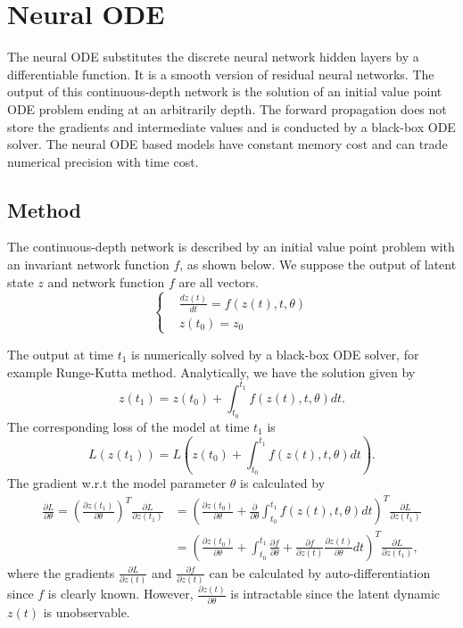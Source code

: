 \section{Neural ODE}

The neural ODE \cite{chen2019neuralordinarydifferentialequations} substitutes the discrete neural network hidden layers by a differentiable function. 
It is a smooth version of residual neural networks. 
The output of this continuous-depth network is the solution of an initial value point ODE problem ending at an arbitrarily depth. 
The forward propagation does not store the gradients and intermediate values and is conducted by a black-box ODE solver. 
The neural ODE based models have constant memory cost and can trade numerical precision with time cost. 

\subsection{Method}

The continuous-depth network is described by an initial value point problem with an invariant network function $f$, as shown below. 
We suppose the output of latent state $z$ and network function $f$ are all vectors. 
\begin{equation*}
    \left\{\begin{aligned}
        &\frac{dz(t)}{dt} = f(z(t),t,\theta) \\
        &z(t_0) = z_0
    \end{aligned}\right.
\end{equation*}

The output at time $t_1$ is numerically solved by a black-box ODE solver, for example Runge-Kutta method. 
Analytically, we have the solution given by 
\begin{equation*}
    z(t_1) = z(t_0) + \int_{t_0}^{t_1} f(z(t),t,\theta)dt. 
\end{equation*}
The corresponding loss of the model at time $t_1$ is 
\begin{equation*}
    L(z(t_1)) = L\left(z(t_0) + \int_{t_0}^{t_1} f(z(t),t,\theta)dt\right). 
\end{equation*}
The gradient w.r.t the model parameter $\theta$ is calculated by 
\begin{align*}
    \frac{\partial L}{\partial \theta} = \left(\frac{\partial z(t_1)}{\partial \theta}\right)^T\frac{\partial L}{\partial z(t_1)} &= \left(\frac{\partial z(t_0)}{\partial \theta}+\frac{\partial}{\partial \theta}\int_{t_0}^{t_1}f(z(t),t,\theta)dt\right)^T\frac{\partial L}{\partial z(t_1)} \\
                                                                                                                   &= \left(\frac{\partial z(t_0)}{\partial \theta}+\int_{t_0}^{t_1}\frac{\partial f}{\partial \theta}+\frac{\partial f}{\partial z(t)}\frac{\partial z(t)}{\partial \theta}dt\right)^T\frac{\partial L}{\partial z(t_1)}, 
\end{align*}
where the gradients $\frac{\partial L}{\partial z(t)}$ and $\frac{\partial f}{\partial z(t)}$ can be calculated by auto-differentiation since $f$ is clearly known.
However, $\frac{\partial z(t)}{\partial \theta}$ is intractable since the latent dynamic $z(t)$ is unobservable.

